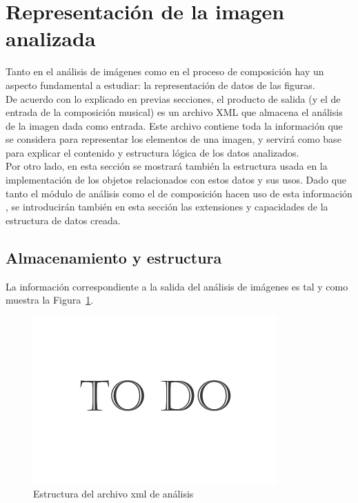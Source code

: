 \section{Representación de la imagen analizada}
\label{sec:representacionFiguras}

Tanto en el análisis de imágenes como en el proceso de composición hay un aspecto fundamental a estudiar: la representación de datos de las figuras.\\

De acuerdo con lo explicado en previas secciones, el producto de salida  (y el de entrada de la composición musical) es un archivo XML que almacena el análisis de la imagen dada como entrada. Este archivo contiene toda la información que se considera para representar los elementos de una imagen, y servirá como base para explicar el contenido y estructura lógica de los datos analizados.\\

Por otro lado, en esta sección se mostrará también la estructura usada en la implementación de los objetos relacionados con estos datos y sus usos. Dado que tanto el módulo de análisis como el de composición hacen uso de esta información , se introducirán también en esta sección las extensiones y capacidades de la estructura de datos creada.

\subsection{Almacenamiento y estructura}
\label{subsec:xmlstruct}

	La información correspondiente a la salida del análisis de imágenes es tal y como muestra la Figura~\ref{fig:estructuraFiguras}.\\

			\begin{figure}[htbp]
			\centering
			\includegraphics[scale=0.47]{graphics/todo.png}
			\caption{Estructura del archivo xml de análisis}
			\label{fig:estructuraFiguras}
			\end{figure}
		
